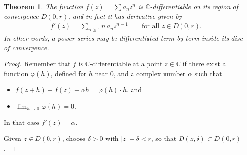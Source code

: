 \documentclass[11pt]{article}
\theoremstyle{plain}
\newtheorem{theorem}{Theorem}[section]
\theoremstyle{definition}
\theoremstyle{remark}
\numberwithin{equation}{section}
\newcommand{\be}{\begin{eqnarray}}
\newcommand{\ee}{\end{eqnarray}}
\newcommand{\C}{\mathbb{C}}
\begin{document}
\begin{theorem}
\label{thm:ps-diff}
The function $f(z)=\sum a_nz^n$ is $\C$-differentiable on its region of
convergence $D(0,r)$, and in fact it has derivative given by
\be
 f'(z)=\sum_{n\geq1}n\,a_nz^{n-1}\qquad\text{for all }z\in D(0,r).
\ee
In other words, a power series may be differentiated term by term inside its disc
of convergence.
\end{theorem}

\begin{proof}
Remember that $f$ is $\C$-differentiable at a point $z\in\C$ if there exist
a function $\varphi(h)$, defined for $h$ near $0$, and a complex number
$\alpha$ such that

\noindent
\begin{minipage}[c]{0.58\textwidth}
\setlength{\parskip}{0.65em}
\begin{itemize}
  \item $f(z+h)-f(z)-\alpha h=\varphi(h)\cdot h$, and
  \item $\lim_{h\to0}\varphi(h)=0$.
\end{itemize}
In that case $f'(z)=\alpha$.

Given $z\in D(0,r)$, choose $\delta>0$ with $|z|+\delta<r$, so that
$D(z,\delta)\subset D(0,r)$.
\end{minipage}\hfill
\begin{minipage}[c]{0.4\textwidth}
\centering
{}
\end{minipage}


\end{proof}
\end{document}
